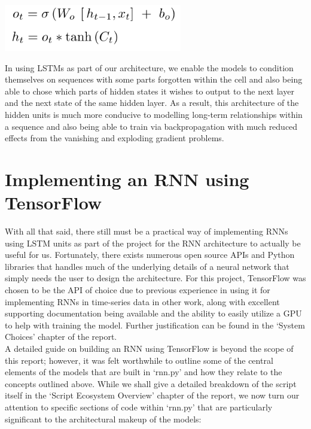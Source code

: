 \documentclass[12pt,twoside]{report}
\begin{document}
\begin{center}
\includegraphics[scale=0.7]{project_figures/fig3_11}
\end{center}

\quad In using LSTMs as part of our architecture, we enable the models to condition themselves on sequences with some parts forgotten within the cell and also being able to chose which parts of hidden states it wishes to output to the next layer and the next state of the same hidden layer. As a result, this architecture of the hidden units is much more conducive to modelling long-term relationships within a sequence and also being able to train via backpropagation with much reduced effects from the vanishing and exploding gradient problems.\\



\section{Implementing an RNN using TensorFlow}

\quad With all that said, there still must be a practical way of implementing RNNs using LSTM units as part of the project for the RNN architecture to actually be useful for us. Fortunately, there exists numerous open source APIs and Python libraries that handles much of the underlying details of a neural network that simply needs the user to design the architecture. For this project, TensorFlow was chosen to be the API of choice due to previous experience in using it for implementing RNNs in time-series data in other work, along with excellent supporting documentation being available and the ability to easily utilize a GPU to help with training the model. Further justification can be found in the ‘System Choices’ chapter of the report.\\

\quad A detailed guide on building an RNN using TensorFlow is beyond the scope of this report; however, it was felt worthwhile to outline some of the central elements of the models that are built in ‘rnn.py’ and how they relate to the concepts outlined above. While we shall give a detailed breakdown of the script itself in the ‘Script Ecosystem Overview’ chapter of the report, we now turn our attention to specific sections of code within ‘rnn.py’ that are particularly significant to the architectural makeup of the models:\\
\end{document}
